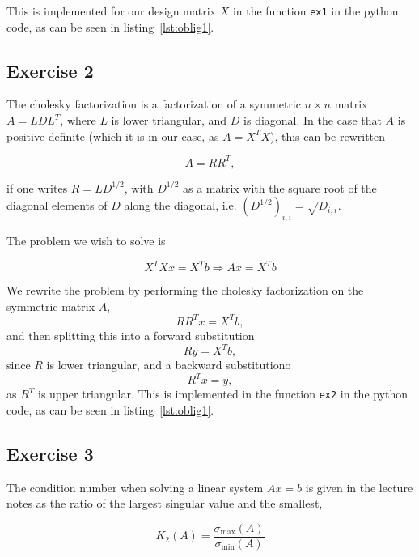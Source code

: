 \documentclass[a11paper, 10pt]{article}
\begin{document}
This is implemented for our design matrix $X$ in the function \texttt{ex1}
in the python code, as can be seen in listing~\ref{lst:oblig1}. 

\subsection*{Exercise 2}
The cholesky factorization is a factorization of a symmetric $n\times n$
matrix $A = LDL^T$, where $L$ is lower triangular, and $D$ is diagonal. In the case that $A$ is positive definite (which it
is in our case, as $A = X^TX$), this can be rewritten 

\begin{equation}
    A = RR^T,
\end{equation}

if one writes $R = L D^{1/2}$, with $D^{1/2}$ as a matrix with the square
root of the diagonal elements of $D$ along the diagonal, i.e.
$(D^{1/2})_{i,i}  = \sqrt{D_{i,i}}$. 

The problem we wish to solve is 

\begin{equation}
    X^T X x = X^T b \Rightarrow Ax = X^T b
\end{equation}

We rewrite the problem by
performing the cholesky factorization on the symmetric matrix $A$,
%
\begin{equation}
     RR^Tx = X^T b,
\end{equation}
%
and then splitting this into a forward substitution 
%
\begin{equation}
     R y = X^T b,
\end{equation}
%
since $R$ is lower triangular, and a backward substitutiono
%
\begin{equation}
     R^T x = y,
\end{equation}
%
as $R^T$ is upper triangular.  This is implemented in the function
\texttt{ex2} in the python code, as can be seen in
listing~\ref{lst:oblig1}.  

\subsection*{Exercise 3}


The condition number when solving a linear system $Ax = b$ is given in the lecture
notes as the ratio of the largest singular value and the smallest,

\begin{equation}
    K_2(A) = \frac{\sigma_{\text{max}}
    (A)}{\sigma_{\text{min}}(A)}
\end{equation}
\end{document}
